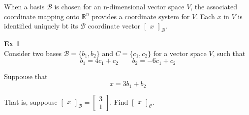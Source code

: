 \documentclass{article}
\title{}
\begin{document}
    \maketitle

    When a basis $ \mathcal{B} $ is chosen for an n-dimensional vector space $ V $, the associated coordinate mapping onto $ \mathbb{R}^{n} $ provides a coordinate system for $ V $. Each $ x $ in $ V $ is identified uniquely bt its $ \mathcal{B} $ coordinate vector $ \begin{bmatrix}
        x
    \end{bmatrix}_{\mathcal{B}} $.

    \textbf{Ex 1}\\
  Consider two bases $ \mathcal{B} = \{ b_{1},b_{2} \} $ and $ C=\{ c_{1},c_{2} \} $ for a vector space $ V $, such that
  \[
      b_{1}=4c_{1}+c_{2} \qquad b_{2} = -6c_{1}+c_{2}      
  \]

  Suppouse that
  \[
      x=3b_{1}+b_{2}  
  \]

  That is, suppouse $ \begin{bmatrix}
      x
  \end{bmatrix}_{\mathcal{B}} = \begin{bmatrix}
      3\\
      1
  \end{bmatrix} $. Find $ \begin{bmatrix}
      x
  \end{bmatrix}_{\mathcal{C}}  $.
\end{document}
